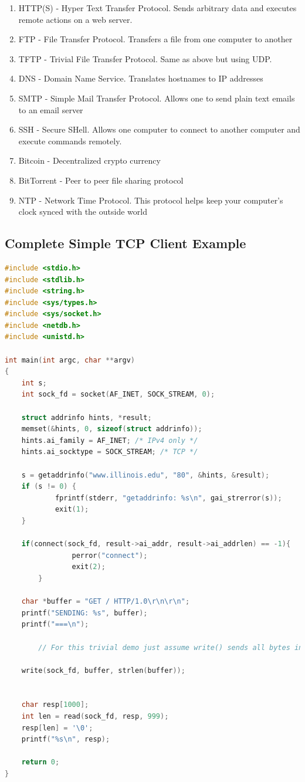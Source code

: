 \begin{enumerate}
  \item HTTP(S) - Hyper Text Transfer Protocol. Sends arbitrary data and executes remote actions on a web server.
  \item FTP - File Transfer Protocol. Transfers a file from one computer to another
  \item TFTP - Trivial File Transfer Protocol. Same as above but using UDP.
  \item DNS - Domain Name Service. Translates hostnames to IP addresses
  \item SMTP - Simple Mail Transfer Protocol. Allows one to send plain text emails to an email server
  \item SSH - Secure SHell. Allows one computer to connect to another computer and execute commands remotely.
  \item Bitcoin - Decentralized crypto currency
  \item BitTorrent - Peer to peer file sharing protocol
  \item NTP - Network Time Protocol. This protocol helps keep your computer's clock synced with the outside world
\end{enumerate}

\subsection{Complete Simple TCP Client Example}\label{complete-simple-tcp-client-example}

\begin{lstlisting}[language=C]
#include <stdio.h>
#include <stdlib.h>
#include <string.h>
#include <sys/types.h>
#include <sys/socket.h>
#include <netdb.h>
#include <unistd.h>

int main(int argc, char **argv)
{
    int s;
    int sock_fd = socket(AF_INET, SOCK_STREAM, 0);

    struct addrinfo hints, *result;
    memset(&hints, 0, sizeof(struct addrinfo));
    hints.ai_family = AF_INET; /* IPv4 only */
    hints.ai_socktype = SOCK_STREAM; /* TCP */

    s = getaddrinfo("www.illinois.edu", "80", &hints, &result);
    if (s != 0) {
            fprintf(stderr, "getaddrinfo: %s\n", gai_strerror(s));
            exit(1);
    }

    if(connect(sock_fd, result->ai_addr, result->ai_addrlen) == -1){
                perror("connect");
                exit(2);
        }

    char *buffer = "GET / HTTP/1.0\r\n\r\n";
    printf("SENDING: %s", buffer);
    printf("===\n");

        // For this trivial demo just assume write() sends all bytes in one go and is not interrupted

    write(sock_fd, buffer, strlen(buffer));


    char resp[1000];
    int len = read(sock_fd, resp, 999);
    resp[len] = '\0';
    printf("%s\n", resp);

    return 0;
}
\end{lstlisting}

